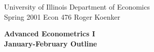 
\setlength{\textwidth}{170mm}
\setlength{\textheight}{220mm}
\setlength{\oddsidemargin}{0mm}
\setlength{\evensidemargin}{10mm}
\setlength{\topmargin}{-10mm}
\def\RR{\hbox{\raise.4ex\hbox{$\scriptstyle{|}$}\hskip-1.85pt R}}
\newcommand{\REF}{\nopagebreak\noindent{\large{\bf
      References}}\vspace{.2in}}

\newcommand{\Ref}[1]{\medskip\noindent\hangafter=1
      \hangindent=20pt\ignorespaces #1}
\pagestyle{empty}



\noindent
University of Illinois \hfill Department of Economics \\
Spring 2001 \hfill Econ 476 \hfill Roger Koenker

\begin{center}
\large{
{\bf Advanced Econometrics I \\
January-February Outline}}
\end{center}

